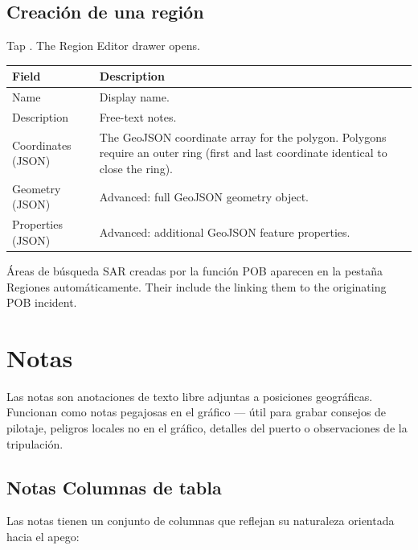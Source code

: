 \section{Creación de una región}

Tap . The Region Editor drawer opens.

\begin{longtable}{L{3cm} L{10.7cm}}
\toprule
{}
{\sffamily\bfseries\color{white} Field} &
{\sffamily\bfseries\color{white} Description} \\
\midrule
Name & Display name. \\
Description & Free-text notes. \\
Coordinates (JSON) & The GeoJSON coordinate array for the polygon. Polygons require an outer ring (first and last coordinate identical to close the ring). \\
Geometry (JSON) & Advanced: full GeoJSON geometry object. \\
Properties (JSON) & Advanced: additional GeoJSON feature properties. \\
\bottomrule
\end{longtable}

\begin{notebox}
Áreas de búsqueda SAR creadas por la función POB aparecen en la pestaña Regiones automáticamente.
Their  include the  linking them to the originating POB incident.
\end{notebox}

\chapter{Notas}
\label{ch:notes}

Las notas son anotaciones de texto libre adjuntas a posiciones geográficas.
Funcionan como notas pegajosas en el gráfico --- útil para grabar consejos de pilotaje, peligros locales no
en el gráfico, detalles del puerto o observaciones de la tripulación.


\section{Notas Columnas de tabla}

Las notas tienen un conjunto de columnas que reflejan su naturaleza orientada hacia el apego:


